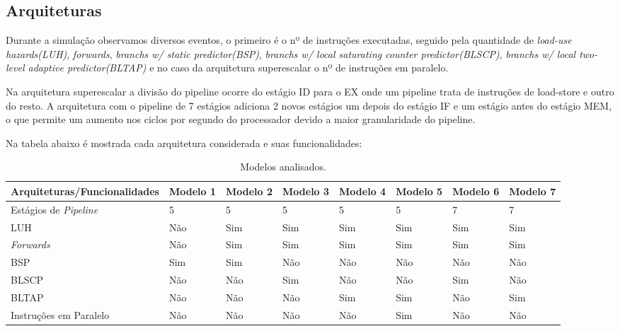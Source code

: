 \documentclass[pdftex,12pt,a4paper]{article}
\begin{document}
\subsection{Arquiteturas}

Durante a simulação observamos diversos eventos, o primeiro é o nº de instruções executadas, seguido pela 
quantidade de \textit{load-use hazards(LUH)}, \textit{forwards}, \textit{branchs w/ static predictor(BSP)}, 
\textit{branchs w/ local saturating counter predictor(BLSCP)}, \textit{branchs w/ local two-level adaptive 
predictor(BLTAP)} e no caso da arquitetura superescalar o nº de instruções em paralelo.

Na arquitetura superescalar a divisão do pipeline ocorre do estágio ID para o EX onde um pipeline 
trata de instruções de load-store e outro do resto. A arquitetura com o pipeline de 7 estágios 
adiciona 2 novos estágios um depois do estágio IF e um estágio antes do estágio MEM, o que 
permite um aumento nos ciclos por segundo do processador devido a maior granularidade do 
pipeline.

Na tabela abaixo é mostrada cada arquitetura considerada e suas funcionalidades:

\begin{table}[h]
\resizebox{17cm}{!} {
\begin{tabular}{l|lllllll}
Arquiteturas/Funcionalidades  & Modelo 1 & Modelo 2 & Modelo 3 & Modelo 4 & Modelo 5 & Modelo 6 & Modelo 7 \\ \hline
Estágios de \textit{Pipeline} & 5        & 5        & 5        & 5        & 5        & 7        & 7        \\
LUH                           & Não      & Sim      & Sim      & Sim      & Sim      & Sim      & Sim      \\
\textit{Forwards}             & Não      & Sim      & Sim      & Sim      & Sim      & Sim      & Sim      \\
BSP                           & Sim      & Sim      & Não      & Não      & Não      & Não      & Não      \\
BLSCP                         & Não      & Não      & Sim      & Não      & Não      & Sim      & Não      \\
BLTAP                         & Não      & Não      & Não      & Sim      & Sim      & Não      & Sim      \\
Instruções em Paralelo        & Não      & Não      & Não      & Não      & Sim      & Não      & Não      \\ \hline
\end{tabular}
}
\caption{Modelos analisados.}
\label{tab1}
\end{table}
\end{document}
